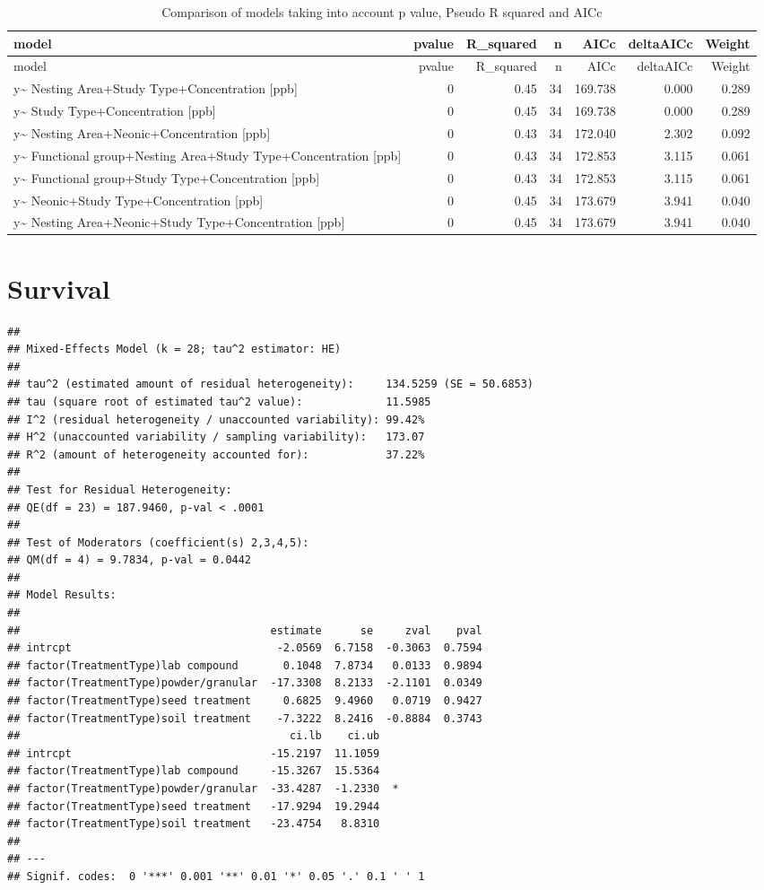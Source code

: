 \documentclass[]{elsarticle} %
\begin{document}
\begin{longtable}[c]{@{}lrrrrrr@{}}
\caption{Comparison of models taking into account p value, Pseudo R
squared and AICc}\tabularnewline
\toprule
model & pvalue & R\_squared & n & AICc & deltaAICc &
Weight\tabularnewline
\midrule
\endfirsthead
\toprule
model & pvalue & R\_squared & n & AICc & deltaAICc &
Weight\tabularnewline
\midrule
\endhead
y\textasciitilde{} Nesting Area+Study Type+Concentration {[}ppb{]} & 0 &
0.45 & 34 & 169.738 & 0.000 & 0.289\tabularnewline
y\textasciitilde{} Study Type+Concentration {[}ppb{]} & 0 & 0.45 & 34 &
169.738 & 0.000 & 0.289\tabularnewline
y\textasciitilde{} Nesting Area+Neonic+Concentration {[}ppb{]} & 0 &
0.43 & 34 & 172.040 & 2.302 & 0.092\tabularnewline
y\textasciitilde{} Functional group+Nesting Area+Study
Type+Concentration {[}ppb{]} & 0 & 0.43 & 34 & 172.853 & 3.115 &
0.061\tabularnewline
y\textasciitilde{} Functional group+Study Type+Concentration {[}ppb{]} &
0 & 0.43 & 34 & 172.853 & 3.115 & 0.061\tabularnewline
y\textasciitilde{} Neonic+Study Type+Concentration {[}ppb{]} & 0 & 0.45
& 34 & 173.679 & 3.941 & 0.040\tabularnewline
y\textasciitilde{} Nesting Area+Neonic+Study Type+Concentration
{[}ppb{]} & 0 & 0.45 & 34 & 173.679 & 3.941 & 0.040\tabularnewline
\bottomrule
\end{longtable}

\section{Survival}\label{survival}

\begin{verbatim}
## 
## Mixed-Effects Model (k = 28; tau^2 estimator: HE)
## 
## tau^2 (estimated amount of residual heterogeneity):     134.5259 (SE = 50.6853)
## tau (square root of estimated tau^2 value):             11.5985
## I^2 (residual heterogeneity / unaccounted variability): 99.42%
## H^2 (unaccounted variability / sampling variability):   173.07
## R^2 (amount of heterogeneity accounted for):            37.22%
## 
## Test for Residual Heterogeneity: 
## QE(df = 23) = 187.9460, p-val < .0001
## 
## Test of Moderators (coefficient(s) 2,3,4,5): 
## QM(df = 4) = 9.7834, p-val = 0.0442
## 
## Model Results:
## 
##                                       estimate      se     zval    pval
## intrcpt                                -2.0569  6.7158  -0.3063  0.7594
## factor(TreatmentType)lab compound       0.1048  7.8734   0.0133  0.9894
## factor(TreatmentType)powder/granular  -17.3308  8.2133  -2.1101  0.0349
## factor(TreatmentType)seed treatment     0.6825  9.4960   0.0719  0.9427
## factor(TreatmentType)soil treatment    -7.3222  8.2416  -0.8884  0.3743
##                                          ci.lb    ci.ub   
## intrcpt                               -15.2197  11.1059   
## factor(TreatmentType)lab compound     -15.3267  15.5364   
## factor(TreatmentType)powder/granular  -33.4287  -1.2330  *
## factor(TreatmentType)seed treatment   -17.9294  19.2944   
## factor(TreatmentType)soil treatment   -23.4754   8.8310   
## 
## ---
## Signif. codes:  0 '***' 0.001 '**' 0.01 '*' 0.05 '.' 0.1 ' ' 1
\end{verbatim}
\end{document}
